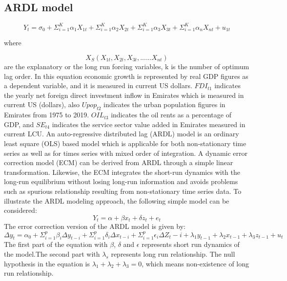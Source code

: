 \documentclass[12pt,a4 paper,title page]{article}
\begin{document}
\subsection{ARDL model}
\begin{equation}
 Y_t = \sigma_0 + \Sigma^K _{i=1} \alpha_1 X_{1t} + \Sigma^K_{i=1} \alpha_2 X_{2t} + \Sigma^K_ {i=1} \alpha_3 X_{3t}+ \Sigma^K_{i=1} \alpha_n X_{nt} + u_{1t}   
\end{equation}
 

where

$$ X_S (X_{1t},X_{2t},X_{3t},......X_{nt}) $$
are the explanatory or the long run forcing variables, k is the number of optimum lag order.
In this equation economic growth is represented by real GDP figures as a dependent variable, and it is measured in current US dollars.
$ FDI_{t1}$ indicates the yearly net foreign direct investment inflow in Emirates which is measured in current US (dollars), 
also $Upop_{t2}$ indicates the urban population figures in Emirates from 1975 to 2019. $OIL_{t3}$ indicates the oil rents as a percentage of GDP, and $SE_{t4}$ indicates the service sector value added  in Emirates measured in current LCU.
An auto-regressive distributed lag (ARDL) model is an
ordinary least square (OLS) based model which is applicable for both non-stationary time series as well as for times series with mixed order of integration.
A dynamic error correction model (ECM) can be derived from ARDL through a simple linear transformation. Likewise, the
ECM integrates the short-run dynamics with the long-run equilibrium without losing long-run information and avoids problems such as spurious relationship resulting from non-stationary time series data.
To illustrate the ARDL modeling approach, the following simple model can be considered:
\begin{equation}
 Y_t = \alpha + \beta x_t + \delta z_t + e_t
\end{equation}
The error correction version of the ARDL model is given by:
\begin{equation}
\Delta y_t = \alpha_0 + \Sigma^p_{i=1}\beta_i\Delta y_{t-i}+\Sigma^p_{i=1}\delta_i \Delta x_{t-i} + \Sigma^p_{i=1}\epsilon_i\Delta Z_t-i + \lambda_1 y_{t-1}+\lambda_2 x_{t-1}+\lambda_3 z_{t-1} + u_t
\end{equation}
\hfill \break
The first part of the equation with $\beta$, $\delta$ and $\epsilon$ represents short run dynamics of the model.The second part with $\lambda_s$ represents long run relationship. The null hypothesis in the equation is $\lambda_1 + \lambda_2 + \lambda_3 = 0 $, which means non-existence of long run relationship. 
\end{document}
